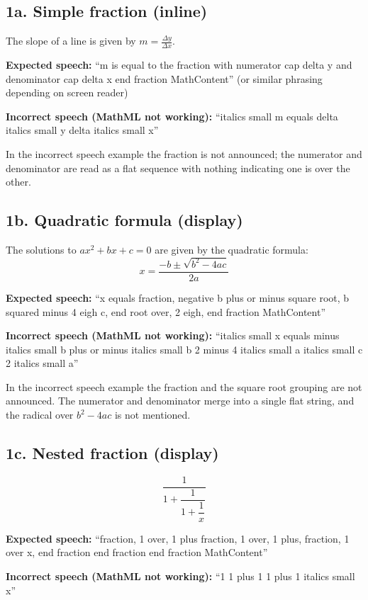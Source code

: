 \documentclass{article}
\begin{document}
\subsection*{1a. Simple fraction (inline)}

The slope of a line is given by 
$m = \frac{\Delta y}{\Delta x}$.

\textbf{Expected speech:} ``m is equal to the fraction with numerator 
cap delta y and denominator cap delta x end fraction MathContent'' 
(or similar phrasing depending on screen reader)

\textbf{Incorrect speech (MathML not working):} ``italics small m 
equals delta italics small y delta italics small x''

In the incorrect speech example the fraction is not announced; the 
numerator and denominator are read as a flat sequence with nothing 
indicating one is over the other.

\subsection*{1b. Quadratic formula (display)}

The solutions to $ax^2 + bx + c = 0$ are given by the quadratic formula:
\[
  x = \frac{-b \pm \sqrt{b^2 - 4ac}}{2a}
\]

\textbf{Expected speech:} ``x equals fraction, negative b plus or minus 
square root, b squared minus 4 eigh c, end root over, 2 eigh, 
end fraction MathContent''

\textbf{Incorrect speech (MathML not working):} ``italics small x equals 
minus italics small b plus or minus italics small b 2 minus 4 italics 
small a italics small c 2 italics small a''

In the incorrect speech example the fraction and the square root grouping 
are not announced. The numerator and denominator merge into a single flat 
string, and the radical over $b^2 - 4ac$ is not mentioned.

\subsection*{1c. Nested fraction (display)}

\[
  \frac{1}{1 + \dfrac{1}{1 + \dfrac{1}{x}}}
\]

\textbf{Expected speech:} ``fraction, 1 over, 1 plus fraction, 1 over, 1 plus, 
fraction, 1 over x, end fraction end fraction end fraction MathContent''

\textbf{Incorrect speech (MathML not working):} ``1 1 plus 1 1 plus 1 italics 
small x'' 
\end{document}
